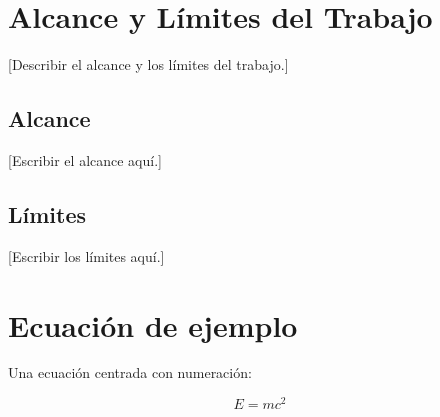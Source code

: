 
\section{Alcance y Límites del Trabajo}

[Describir el alcance y los límites del trabajo.]

\subsection{Alcance}

[Escribir el alcance aquí.]

\subsection{Límites}

[Escribir los límites aquí.]

\section{Ecuación de ejemplo}

Una ecuación centrada con numeración:

\begin{equation}
  E = mc^2
\end{equation}
